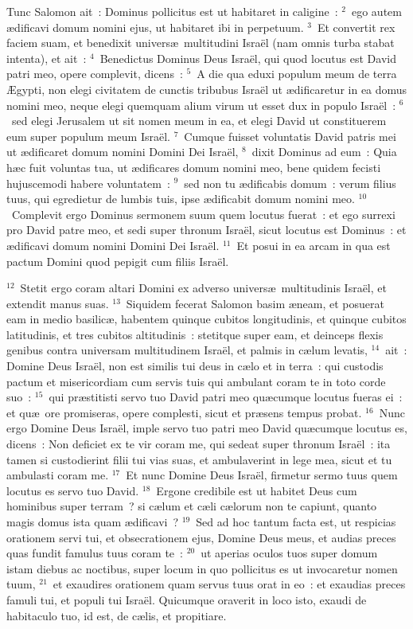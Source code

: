 \lettrine[lines=10,image=true,loversize=0.05,lraise=-0.03]{T}{}unc Salomon ait~: Dominus pollicitus est ut habitaret in caligine~:
${}^{2}$~ego autem \ae dificavi domum nomini ejus, ut habitaret ibi in perpetuum.
${}^{3}$~Et convertit rex faciem suam, et benedixit univers\ae\ multitudini Isra\"el (nam omnis turba stabat intenta), et ait~:
${}^{4}$~Benedictus Dominus Deus Isra\"el, qui quod locutus est David patri meo, opere complevit, dicens~:
${}^{5}$~A die qua eduxi populum meum de terra \AE gypti, non elegi civitatem de cunctis tribubus Isra\"el ut \ae dificaretur in ea domus nomini meo, neque elegi quemquam alium virum ut esset dux in populo Isra\"el~:
${}^{6}$~sed elegi Jerusalem ut sit nomen meum in ea, et elegi David ut constituerem eum super populum meum Isra\"el.
${}^{7}$~Cumque fuisset voluntatis David patris mei ut \ae dificaret domum nomini Domini Dei Isra\"el,
${}^{8}$~dixit Dominus ad eum~: Quia h\ae c fuit voluntas tua, ut \ae dificares domum nomini meo, bene quidem fecisti hujuscemodi habere voluntatem~:
${}^{9}$~sed non tu \ae dificabis domum~: verum filius tuus, qui egredietur de lumbis tuis, ipse \ae dificabit domum nomini meo.
${}^{10}$~Complevit ergo Dominus sermonem suum quem locutus fuerat~: et ego surrexi pro David patre meo, et sedi super thronum Isra\"el, sicut locutus est Dominus~: et \ae dificavi domum nomini Domini Dei Isra\"el.
${}^{11}$~Et posui in ea arcam in qua est pactum Domini quod pepigit cum filiis Isra\"el.


${}^{12}$~Stetit ergo coram altari Domini ex adverso univers\ae\ multitudinis Isra\"el, et extendit manus suas.
${}^{13}$~Siquidem fecerat Salomon basim \ae neam, et posuerat eam in medio basilic\ae , habentem quinque cubitos longitudinis, et quinque cubitos latitudinis, et tres cubitos altitudinis~: stetitque super eam, et deinceps flexis genibus contra universam multitudinem Isra\"el, et palmis in c\ae lum levatis,
${}^{14}$~ait~: Domine Deus Isra\"el, non est similis tui deus in c\ae lo et in terra~: qui custodis pactum et misericordiam cum servis tuis qui ambulant coram te in toto corde suo~:
${}^{15}$~qui pr\ae stitisti servo tuo David patri meo qu\ae cumque locutus fueras ei~: et qu\ae\ ore promiseras, opere complesti, sicut et pr\ae sens tempus probat.
${}^{16}$~Nunc ergo Domine Deus Isra\"el, imple servo tuo patri meo David qu\ae cumque locutus es, dicens~: Non deficiet ex te vir coram me, qui sedeat super thronum Isra\"el~: ita tamen si custodierint filii tui vias suas, et ambulaverint in lege mea, sicut et tu ambulasti coram me.
${}^{17}$~Et nunc Domine Deus Isra\"el, firmetur sermo tuus quem locutus es servo tuo David.
${}^{18}$~Ergone credibile est ut habitet Deus cum hominibus super terram~? si c\ae lum et c\ae li c\ae lorum non te capiunt, quanto magis domus ista quam \ae dificavi~?
${}^{19}$~Sed ad hoc tantum facta est, ut respicias orationem servi tui, et obsecrationem ejus, Domine Deus meus, et audias preces quas fundit famulus tuus coram te~:
${}^{20}$~ut aperias oculos tuos super domum istam diebus ac noctibus, super locum in quo pollicitus es ut invocaretur nomen tuum,
${}^{21}$~et exaudires orationem quam servus tuus orat in eo~: et exaudias preces famuli tui, et populi tui Isra\"el. Quicumque oraverit in loco isto, exaudi de habitaculo tuo, id est, de c\ae lis, et propitiare.


